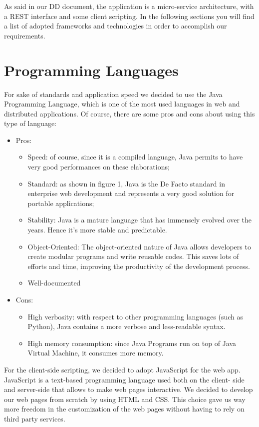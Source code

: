 As said in our DD document, the application is a micro-service architecture, with a REST interface and some client scripting. In the following sections you will find a list of adopted frameworks and technologies in order to accomplish our requirements.

\section{Programming Languages}
For sake of standards and application speed we decided to use the Java Programming
Language, which is one of the most used languages in web and distributed
applications.
Of course, there are some pros and cons about using this type of language:
\begin{itemize}
    \item Pros:
    \begin{itemize}
        \item Speed: of course, since it is a compiled language, Java permits to  have very good performances on these elaborations;
        \item Standard: as shown in figure 1, Java is the De Facto standard in enterprise web development and represents a very good solution for portable applications;
        \item Stability: Java is a mature language that has immensely evolved over the years. Hence it's more stable and predictable.
        \item Object-Oriented: The object-oriented nature of Java allows developers to create modular programs and write reusable codes. This saves lots of efforts and time, improving the productivity of the development process.
        \item Well-documented
    \end{itemize}
    \newpage
    \item Cons:
    \begin{itemize} 
            \item High verbosity: with respect to other programming languages (such as Python), Java contains a more verbose and less-readable syntax.
            \item High memory consumption: since Java Programs run on top of Java Virtual Machine, it consumes more memory.
    \end{itemize}
\end{itemize}
For the client-side scripting, we decided to adopt JavaScript for the web
app. JavaScript is a text-based programming language used both on the client-
side and server-side that allows to make web pages interactive. We decided to develop our web pages from scratch by using HTML and CSS. This choice gave us way more freedom in the customization of the web pages without having to rely on third party services.


